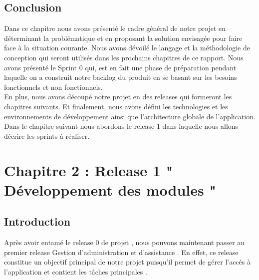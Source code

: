 \documentclass{article}
\begin{document}
\subsection{Conclusion}
Dans ce chapitre nous avons présenté le cadre général de notre projet en déterminant la problématique et en proposant la solution envisagée pour faire face à la situation courante. Nous avons dévoilé le langage et la méthodologie de conception qui seront utilisés dans les prochains chapitres de ce rapport. Nous avons présenté le Sprint 0 qui, est en fait une phase de préparation pendant laquelle on a construit notre backlog du produit en se basant sur les besoins fonctionnels et non fonctionnels.\\ En plus, nous avons découpé notre projet en des releases qui formeront les chapitres suivants. Et finalement, nous avons défini les technologies et les environnements de développement ainsi que l’architecture globale de l’application.
Dans le chapitre suivant nous abordons le release 1 dans laquelle nous allons décrire les sprints à réaliser.
\cleardoublepage
\setcounter{section}{2}

\section*{Chapitre 2 :  Release 1 " Développement des modules "}
\setcounter{subsection}{0}
\subsection{Introduction}
Après avoir entamé le release 0 de projet , nous
pouvons maintenant passer au premier release \guillemotleft Gestion d'administration et d'assistance \guillemotright . En effet, ce
release constitue un objectif principal de notre projet puisqu'il permet de gérer l'accés à
l'application et contient les tâches principales .
\end{document}
